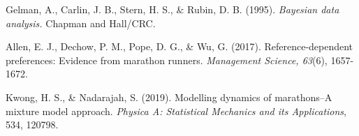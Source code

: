 \documentclass[USenglish,twocolumn]{article}
\theoremstyle{dgthm}
\theoremstyle{dgdef}
\newcommand{\mycomment}[1]{}
\begin{document}
\begin{thebibliography}{9}

\mycomment{
\bibitem{carbonaro:2008}
A. Carbonaro, G. Metafune and C. Spina, Parabolic Schrödinger operators, \emph{J. Math. Anal. Appl.} \textbf{343} (2008), 965–974.

\bibitem{farley:2010}
D. Farley and L. Sabalka, Presentations of graph braid groups, \emph{Forum Math.} (2010), DOI: 10.1515/form.2011.086.

\bibitem{antonyan}
S. A. Antonyan and T. Dobrowolski, Locally contractible coset spaces, \emph{Forum Math.}, to appear.

\bibitem{chen:2013}
Z.-Q. Chen and L. Wang, Uniqueness of stable processes with drift, preprint (2013), http://arxiv.org/pdf/1309.6414v1.

\bibitem{hofmann:2013}
K. H. Hofmann and S. A. Morris, \emph{The Structure of Compact Groups}, 3rd ed., De Gruyter Stud. Math. 25, De Gruyter, Berlin, 2013.

\bibitem{yong:2001}
W.-A. Yong, Basic aspects of hyperbolic relaxation systems, in: \emph{Advances in the Theory of Shock Waves, Progr. Nonlinear Differential Equations Appl. 47}, Birkhäuser, Boston (2001), 259–305.

\bibitem{king:1995}
J. D. King, \emph{Thesis title}, Ph.D. thesis, University of Cambridge, 1995.

\bibitem{hay:2016}
B. Hay, Drone tourism: a study of the current and potential use of drones in hospitality and tourism, in: \emph{CAUTHE 2016: the changing landscape of tourism and hospitality: the impact of emerging markets and emerging destinations}, Blue Mountains, Sydney, 8-11 February, 2016, pp. 49-68. 

}

Gelman, A., Carlin, J. B., Stern, H. S., \& Rubin, D. B. (1995). \emph{Bayesian data analysis.} Chapman and Hall/CRC.

Allen, E. J., Dechow, P. M., Pope, D. G., \& Wu, G. (2017). Reference-dependent preferences: Evidence from marathon runners. \emph{Management Science, 63}(6), 1657-1672.

Kwong, H. S., \& Nadarajah, S. (2019). Modelling dynamics of marathons–A mixture model approach. \emph{Physica A: Statistical Mechanics and its Applications}, 534, 120798.


\end{thebibliography}
\end{document}
